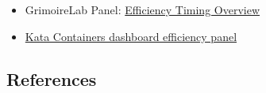 \begin{itemize}
\tightlist
\item
  GrimoireLab Panel:
  \href{https://chaoss.github.io/grimoirelab-sigils/panels/efficiency-timing-overview/}{Efficiency
  Timing Overview}
\item
  \href{https://katacontainers.biterg.io/app/kibana\#/dashboard/cbbdd920-288c-11e9-b662-975152e57997}{Kata
  Containers dashboard efficiency panel}
\end{itemize}

\hypertarget{references}{%
\subsection{References}\label{references}}
